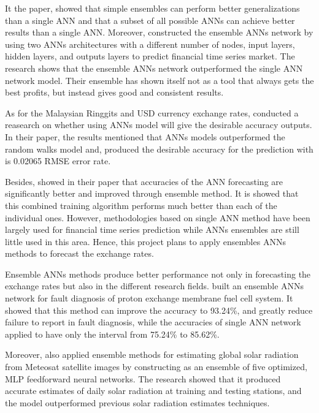 It the paper,    showed that simple ensembles can perform better generalizations than a single ANN and that a subset of all possible ANNs can achieve better results than a single ANN. Moreover,  constructed the ensemble ANNs network by using two ANNs  architectures  with a different number of nodes, input layers, hidden layers, and outputs layers to predict financial time series market. The research shows that the ensemble ANNs  network outperformed the single ANN network model. Their ensemble has shown itself not as a tool that always gets the best profits, but instead gives good and consistent results.

As for the Malaysian Ringgits and USD currency exchange rates,  conducted a reasearch on whether using ANNs model will give the desirable accuracy outputs. In their paper, the results mentioned that ANNs models outperformed the random walks model and, produced the desirable accuracy for the prediction with is 0.02065 RMSE error rate.

Besides,  showed in their paper that accuracies of the ANN forecasting are significantly better and improved  through ensemble method. It is  showed that this combined training algorithm performs much better than each of the individual ones. However, methodologies based on single ANN method have been largely used for financial time series prediction while ANNs ensembles are still little used in this area. Hence, this project plans to apply ensembles ANNs methods to forecast the exchange rates.

Ensemble ANNs methods produce  better performance not only in forecasting the exchange rates but also in the different research fields.  built an ensemble ANNs network for fault diagnosis of proton exchange membrane fuel cell system. It showed that this method can improve the accuracy to 93.24\%, and greatly reduce failure  to report in fault diagnosis, while the accuracies of single  ANN network applied to  have  only the interval from 75.24\% to 85.62\%.

Moreover, also applied ensemble methods for estimating global solar radiation from Meteosat satellite images by constructing as an ensemble of five optimized, MLP feedforward neural networks. The research showed that it produced accurate estimates of daily solar radiation at training and testing stations, and the model outperformed previous solar radiation estimates techniques.

